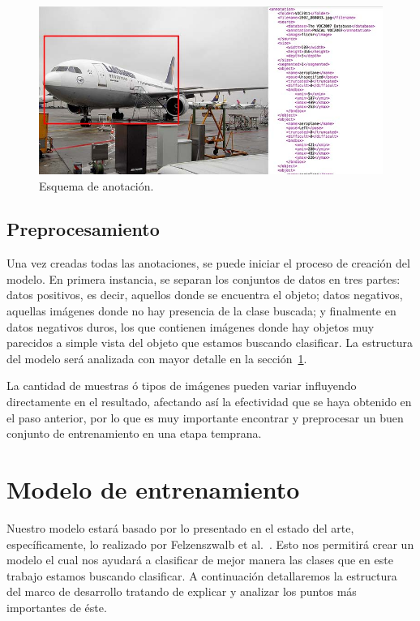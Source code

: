 \begin{figure}[tb]
  \centering
   \includegraphics[width=\textwidth]{Figuras/plain-1.jpg}
   \caption{Esquema de anotación.}
   \label{fig:anota}
\end{figure}

\subsection{Preprocesamiento}\label{subsec:pre}
Una vez creadas todas las anotaciones, se puede iniciar el proceso de creación del modelo. En primera instancia, se separan los conjuntos de datos en tres partes: datos positivos, es decir, aquellos donde se encuentra el objeto; datos negativos, aquellas imágenes donde no hay presencia de la clase buscada; y finalmente en datos negativos duros, los que contienen imágenes donde hay objetos muy parecidos a simple vista del objeto que estamos buscando clasificar. La estructura del modelo será analizada con mayor detalle en la sección~\ref{sec:model}.

La cantidad de muestras ó tipos de imágenes pueden variar influyendo directamente en el resultado, afectando así la efectividad que se haya obtenido en el paso anterior, por lo que es muy importante encontrar y preprocesar un buen conjunto de entrenamiento en una etapa temprana.

\section{Modelo de entrenamiento}\label{sec:model}
Nuestro modelo estará basado por lo presentado en el estado del arte, específicamente, lo realizado por Felzenszwalb et al.~\cite{Felzenszwalb2010}. Esto nos permitirá crear un modelo el cual nos ayudará a clasificar de mejor manera las clases que en este trabajo estamos buscando clasificar. A continuación detallaremos la estructura del marco de desarrollo tratando de explicar y analizar los puntos más importantes de éste.

